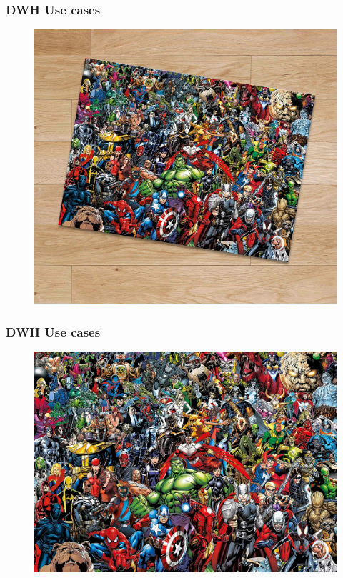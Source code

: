 \begin{frame}
\frametitle{DWH Use cases}
\begin{figure}[ht]
	
	\centering
	\includegraphics[width=\linewidth,height=.8\textheight]{./Figures/chapter-01/Marvel-02.jpg}
\end{figure}
\end{frame}

\begin{frame}
\frametitle{DWH Use cases}
\begin{figure}[ht]
	
	\centering
	\includegraphics[width=\linewidth,height=.8\textheight]{./Figures/chapter-01/Marvel-01.jpg}
\end{figure}
\end{frame}

